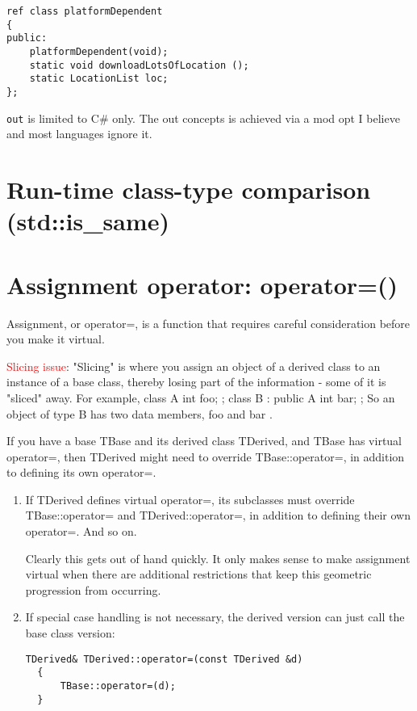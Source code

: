 \begin{verbatim}
ref class platformDependent
{
public:
	platformDependent(void);
	static void downloadLotsOfLocation ();
	static LocationList loc;
};
\end{verbatim}


\begin{framed}
\verb!out! is limited to C\# only. The out concepts is achieved via a mod opt I
believe and most languages ignore it. 
\end{framed}
\section{Run-time class-type comparison (std::is\_same)}
\label{sec:is_same}


\section{Assignment operator: operator=()}
\label{sec:operator=()}

Assignment, or operator=, is a function that requires careful consideration
before you make it virtual.

\begin{mdframed}

\textcolor{red}{Slicing issue}:
"Slicing" is where you assign an object of a derived class to an instance of a
base class, thereby losing part of the information - some of it is "sliced"
away. For example, class A { int foo; }; class B : public A { int bar; }; So an
object of type B has two data members, foo and bar .

\end{mdframed}

If you have a base TBase and its derived class TDerived, and TBase has virtual
operator=, then TDerived might need to override TBase::operator=, in addition to
defining its own operator=.
\begin{enumerate}

  \item If TDerived defines virtual operator=, its subclasses must override
  TBase::operator= and TDerived::operator=, in addition to defining their own
  operator=. And so on.
  
  Clearly this gets out of hand quickly. It only makes sense to make assignment
  virtual when there are additional restrictions that keep this geometric
  progression from occurring.
  
  \item If special case handling is not necessary, the derived version can just call the base class version:

\begin{verbatim}
TDerived& TDerived::operator=(const TDerived &d)
  {
      TBase::operator=(d);
  }
\end{verbatim}
\end{enumerate}
